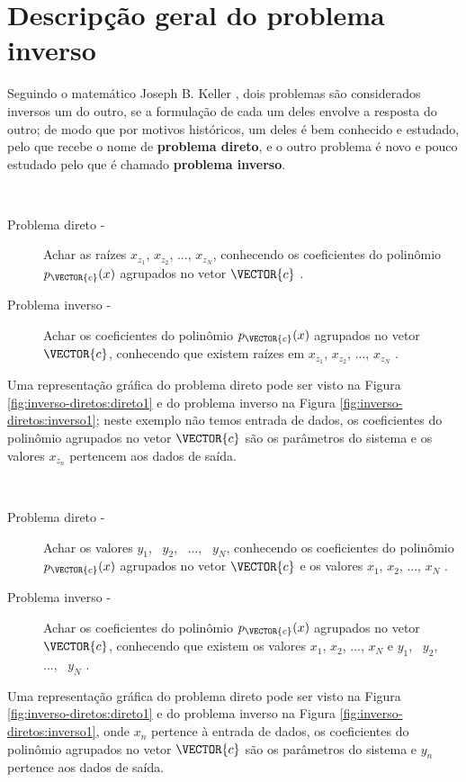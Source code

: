 
\section{Descripção geral do problema inverso}

Seguindo o matemático Joseph B. Keller \cite{Keller76}, dois problemas são considerados inversos 
um do outro, se a formulação de cada um deles envolve a resposta do outro;
de modo que por motivos históricos, um deles é bem conhecido e estudado,
pelo que recebe o nome de \textbf{problema direto}, 
e o outro problema é novo e pouco estudado pelo que é chamado \textbf{problema inverso}.
 
\begin{example}~
\begin{description}
\item[Problema direto -] Achar as raízes $x_{z_1}$, $x_{z_2}$, ..., $x_{z_N}$, 
conhecendo os coeficientes do polinômio $p_{\VECTOR{c}}(x)$ agrupados no vetor $\VECTOR{c}$  \cite{Keller76}.
\item[Problema inverso -] Achar os coeficientes do polinômio $p_{\VECTOR{c}}(x)$ agrupados no vetor $\VECTOR{c}$, 
conhecendo que existem raízes em $x_{z_1}$, $x_{z_2}$, ..., $x_{z_N}$ \cite{Keller76}.
\end{description}
Uma representação gráfica do problema direto pode ser visto na Figura \ref{fig:inverso-diretos:direto1}
e do problema inverso na Figura \ref{fig:inverso-diretos:inverso1};
neste exemplo não temos entrada de dados, 
os coeficientes do polinômio agrupados no vetor $\VECTOR{c}$ são os parâmetros do sistema e 
os valores $x_{z_n}$ pertencem aos dados de saída.
\end{example}

\begin{example}~
\begin{description}
\item[Problema direto -] Achar os valores $y_1$,~ $y_2$,~ ...,~ $y_N$, 
conhecendo os coeficientes do polinômio $p_{\VECTOR{c}}(x)$ agrupados no vetor $\VECTOR{c}$ e
os valores $x_1$, $x_2$, ..., $x_N$ \cite{Keller76}.
\item[Problema inverso -] Achar os coeficientes do polinômio $p_{\VECTOR{c}}(x)$ agrupados no vetor $\VECTOR{c}$, 
conhecendo que existem os valores $x_1$, $x_2$, ..., $x_N$ e 
$y_1$,~ $y_2$,~ ...,~ $y_N$  \cite{Keller76}.
\end{description}
Uma representação gráfica do problema direto pode ser visto na Figura \ref{fig:inverso-diretos:direto1}
e do problema inverso na Figura \ref{fig:inverso-diretos:inverso1}, 
onde $x_n$ pertence à entrada de dados, 
os coeficientes do polinômio agrupados no vetor $\VECTOR{c}$ são os parâmetros do sistema e $y_n$ pertence aos dados de saída.
\end{example}


